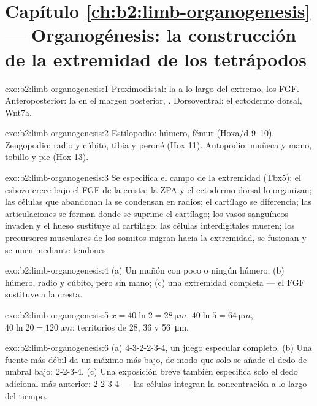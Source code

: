 \section*{Capítulo \ref{ch:b2:limb-organogenesis} --- Organogénesis: la construcción de la extremidad de los tetrápodos}

\begin{solution}{exo:b2:limb-organogenesis:1}
Proximodistal: la  a lo largo del extremo, los
FGF. Anteroposterior: la  en el margen
posterior, . Dorsoventral: el ectodermo dorsal, Wnt7a.
\end{solution}

\begin{solution}{exo:b2:limb-organogenesis:2}
Estilopodio: húmero, fémur (Hoxa/d 9--10). Zeugopodio: radio y cúbito,
tibia y peroné (Hox 11). Autopodio: muñeca y mano, tobillo y pie
(Hox 13).
\end{solution}

\begin{solution}{exo:b2:limb-organogenesis:3}
Se especifica el campo de la extremidad (Tbx5); el esbozo crece bajo el
FGF de la cresta; la ZPA y el ectodermo dorsal lo organizan; las células
que abandonan la  se condensan en radios; el cartílago se
diferencia; las articulaciones se forman donde se suprime el cartílago;
los vasos sanguíneos invaden y el hueso sustituye al cartílago; las
células interdigitales mueren; los precursores musculares de los somitos
migran hacia la extremidad, se fusionan y se unen mediante tendones.
\end{solution}

\begin{solution}{exo:b2:limb-organogenesis:4}
(a) Un muñón con poco o ningún húmero; (b) húmero, radio y cúbito, pero
sin mano; (c) una extremidad completa --- el FGF sustituye a la cresta.
\end{solution}

\begin{solution}{exo:b2:limb-organogenesis:5}
$x = 40\ln 2 = \qty{28}{\micro m}$, $40\ln 5 = \qty{64}{\micro m}$,
$40\ln 20 = \qty{120}{\micro m}$: territorios de 28, 36 y
\qty{56}{\micro m}.
\end{solution}

\begin{solution}{exo:b2:limb-organogenesis:6}
(a) 4-3-2-2-3-4, un juego especular completo. (b) Una fuente más débil da
un máximo más bajo, de modo que solo se añade el dedo de umbral bajo:
2-2-3-4. (c) Una exposición breve también especifica solo el dedo
adicional más anterior: 2-2-3-4 --- las células integran la concentración
a lo largo del tiempo.
\end{solution}


